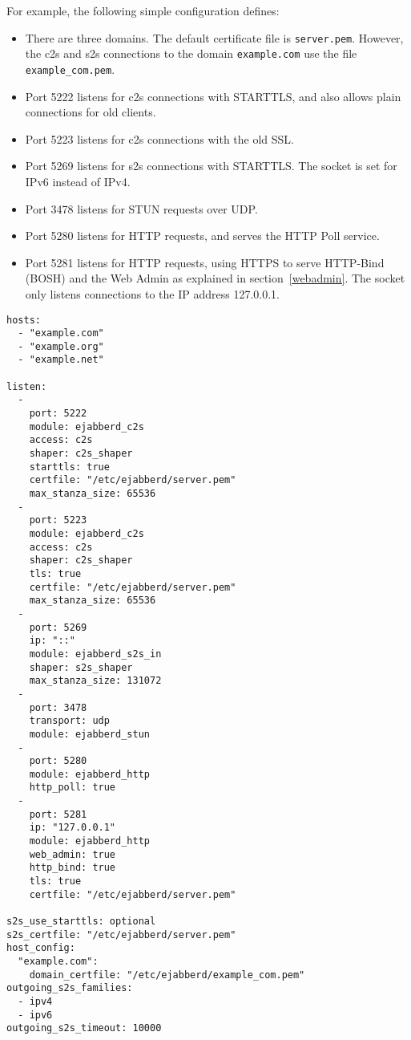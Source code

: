\documentclass[a4paper,10pt]{book}
\newcommand{\term}[1]{\texttt{#1}}
\begin{document}
For example, the following simple configuration defines:
\begin{itemize}
\item There are three domains. The default certificate file is \term{server.pem}.
However, the c2s and s2s connections to the domain \term{example.com} use the file \term{example\_com.pem}.
\item Port 5222 listens for c2s connections with STARTTLS,
  and also allows plain connections for old clients.
\item Port 5223 listens for c2s connections with the old SSL.
\item Port 5269 listens for s2s connections with STARTTLS. The socket is set for IPv6 instead of IPv4.
\item Port 3478 listens for STUN requests over UDP.
\item Port 5280 listens for HTTP requests, and serves the HTTP Poll service.
\item Port 5281 listens for HTTP requests, using HTTPS to serve HTTP-Bind (BOSH) and the Web Admin as explained in
  section~\ref{webadmin}. The socket only listens connections to the IP address 127.0.0.1.
\end{itemize}
\begin{verbatim}
hosts:
  - "example.com"
  - "example.org"
  - "example.net"

listen:
  - 
    port: 5222
    module: ejabberd_c2s
    access: c2s
    shaper: c2s_shaper
    starttls: true
    certfile: "/etc/ejabberd/server.pem"
    max_stanza_size: 65536
  - 
    port: 5223
    module: ejabberd_c2s
    access: c2s
    shaper: c2s_shaper
    tls: true
    certfile: "/etc/ejabberd/server.pem"
    max_stanza_size: 65536
  - 
    port: 5269
    ip: "::"
    module: ejabberd_s2s_in
    shaper: s2s_shaper
    max_stanza_size: 131072
  - 
    port: 3478
    transport: udp
    module: ejabberd_stun
  - 
    port: 5280
    module: ejabberd_http
    http_poll: true
  - 
    port: 5281
    ip: "127.0.0.1"
    module: ejabberd_http
    web_admin: true
    http_bind: true
    tls: true
    certfile: "/etc/ejabberd/server.pem"

s2s_use_starttls: optional
s2s_certfile: "/etc/ejabberd/server.pem"
host_config:
  "example.com":
    domain_certfile: "/etc/ejabberd/example_com.pem"
outgoing_s2s_families:
  - ipv4
  - ipv6
outgoing_s2s_timeout: 10000
\end{verbatim}
\end{document}
